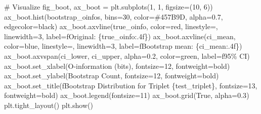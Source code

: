 \documentclass[
  11pt,
  letterpaper,
  oneside,
  openany]{book}
\newenvironment{Shaded}{\begin{snugshade}}{\end{snugshade}}
\newcommand{\CommentTok}[1]{\textcolor[rgb]{0.37,0.37,0.37}{#1}}
\newcommand{\DecValTok}[1]{\textcolor[rgb]{0.68,0.00,0.00}{#1}}
\newcommand{\FloatTok}[1]{\textcolor[rgb]{0.68,0.00,0.00}{#1}}
\newcommand{\NormalTok}[1]{\textcolor[rgb]{0.00,0.23,0.31}{#1}}
\newcommand{\OperatorTok}[1]{\textcolor[rgb]{0.37,0.37,0.37}{#1}}
\newcommand{\SpecialCharTok}[1]{\textcolor[rgb]{0.37,0.37,0.37}{#1}}
\newcommand{\SpecialStringTok}[1]{\textcolor[rgb]{0.13,0.47,0.30}{#1}}
\newcommand{\StringTok}[1]{\textcolor[rgb]{0.13,0.47,0.30}{#1}}
\newcommand{\VariableTok}[1]{\textcolor[rgb]{0.07,0.07,0.07}{#1}}
\begin{document}
\begin{Shaded}
\begin{Highlighting}[]
\CommentTok{\# Visualize}
\NormalTok{fig\_boot, ax\_boot }\OperatorTok{=}\NormalTok{ plt.subplots(}\DecValTok{1}\NormalTok{, }\DecValTok{1}\NormalTok{, figsize}\OperatorTok{=}\NormalTok{(}\DecValTok{10}\NormalTok{, }\DecValTok{6}\NormalTok{))}
\NormalTok{ax\_boot.hist(bootstrap\_oinfos, bins}\OperatorTok{=}\DecValTok{30}\NormalTok{, color}\OperatorTok{=}\StringTok{\textquotesingle{}\#457B9D\textquotesingle{}}\NormalTok{, alpha}\OperatorTok{=}\FloatTok{0.7}\NormalTok{, edgecolor}\OperatorTok{=}\StringTok{\textquotesingle{}black\textquotesingle{}}\NormalTok{)}
\NormalTok{ax\_boot.axvline(true\_oinfo, color}\OperatorTok{=}\StringTok{\textquotesingle{}red\textquotesingle{}}\NormalTok{, linestyle}\OperatorTok{=}\StringTok{\textquotesingle{}{-}{-}\textquotesingle{}}\NormalTok{, linewidth}\OperatorTok{=}\DecValTok{3}\NormalTok{,}
\NormalTok{               label}\OperatorTok{=}\SpecialStringTok{f\textquotesingle{}Original: }\SpecialCharTok{\{}\NormalTok{true\_oinfo}\SpecialCharTok{:.4f\}}\SpecialStringTok{\textquotesingle{}}\NormalTok{)}
\NormalTok{ax\_boot.axvline(ci\_mean, color}\OperatorTok{=}\StringTok{\textquotesingle{}blue\textquotesingle{}}\NormalTok{, linestyle}\OperatorTok{=}\StringTok{\textquotesingle{}{-}\textquotesingle{}}\NormalTok{, linewidth}\OperatorTok{=}\DecValTok{3}\NormalTok{,}
\NormalTok{               label}\OperatorTok{=}\SpecialStringTok{f\textquotesingle{}Bootstrap mean: }\SpecialCharTok{\{}\NormalTok{ci\_mean}\SpecialCharTok{:.4f\}}\SpecialStringTok{\textquotesingle{}}\NormalTok{)}
\NormalTok{ax\_boot.axvspan(ci\_lower, ci\_upper, alpha}\OperatorTok{=}\FloatTok{0.2}\NormalTok{, color}\OperatorTok{=}\StringTok{\textquotesingle{}green\textquotesingle{}}\NormalTok{,}
\NormalTok{               label}\OperatorTok{=}\SpecialStringTok{f\textquotesingle{}95\% CI\textquotesingle{}}\NormalTok{)}
\NormalTok{ax\_boot.set\_xlabel(}\StringTok{\textquotesingle{}O{-}information (bits)\textquotesingle{}}\NormalTok{, fontsize}\OperatorTok{=}\DecValTok{12}\NormalTok{, fontweight}\OperatorTok{=}\StringTok{\textquotesingle{}bold\textquotesingle{}}\NormalTok{)}
\NormalTok{ax\_boot.set\_ylabel(}\StringTok{\textquotesingle{}Bootstrap Count\textquotesingle{}}\NormalTok{, fontsize}\OperatorTok{=}\DecValTok{12}\NormalTok{, fontweight}\OperatorTok{=}\StringTok{\textquotesingle{}bold\textquotesingle{}}\NormalTok{)}
\NormalTok{ax\_boot.set\_title(}\SpecialStringTok{f\textquotesingle{}Bootstrap Distribution for Triplet }\SpecialCharTok{\{}\NormalTok{test\_triplet}\SpecialCharTok{\}}\SpecialStringTok{\textquotesingle{}}\NormalTok{, }
\NormalTok{                 fontsize}\OperatorTok{=}\DecValTok{13}\NormalTok{, fontweight}\OperatorTok{=}\StringTok{\textquotesingle{}bold\textquotesingle{}}\NormalTok{)}
\NormalTok{ax\_boot.legend(fontsize}\OperatorTok{=}\DecValTok{11}\NormalTok{)}
\NormalTok{ax\_boot.grid(}\VariableTok{True}\NormalTok{, alpha}\OperatorTok{=}\FloatTok{0.3}\NormalTok{)}
\NormalTok{plt.tight\_layout()}
\NormalTok{plt.show()}


\end{Highlighting}
\end{Shaded}
\end{document}
